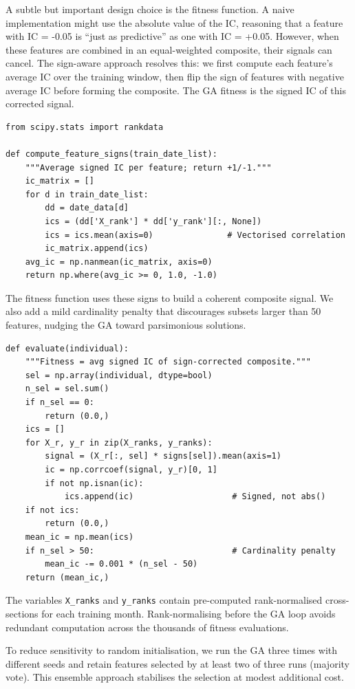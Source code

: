 A subtle but important design choice is the fitness function. A naive implementation might use the absolute value of the IC, reasoning that a feature with IC = -0.05 is ``just as predictive'' as one with IC = +0.05. However, when these features are combined in an equal-weighted composite, their signals can cancel. The sign-aware approach resolves this: we first compute each feature's average IC over the training window, then flip the sign of features with negative average IC before forming the composite. The GA fitness is the signed IC of this corrected signal.

\begin{verbatim}
from scipy.stats import rankdata

def compute_feature_signs(train_date_list):
    """Average signed IC per feature; return +1/-1."""
    ic_matrix = []
    for d in train_date_list:
        dd = date_data[d]
        ics = (dd['X_rank'] * dd['y_rank'][:, None])
        ics = ics.mean(axis=0)               # Vectorised correlation
        ic_matrix.append(ics)
    avg_ic = np.nanmean(ic_matrix, axis=0)
    return np.where(avg_ic >= 0, 1.0, -1.0)
\end{verbatim}

The fitness function uses these signs to build a coherent composite signal. We also add a mild cardinality penalty that discourages subsets larger than 50 features, nudging the GA toward parsimonious solutions.

\begin{verbatim}
def evaluate(individual):
    """Fitness = avg signed IC of sign-corrected composite."""
    sel = np.array(individual, dtype=bool)
    n_sel = sel.sum()
    if n_sel == 0:
        return (0.0,)
    ics = []
    for X_r, y_r in zip(X_ranks, y_ranks):
        signal = (X_r[:, sel] * signs[sel]).mean(axis=1)
        ic = np.corrcoef(signal, y_r)[0, 1]
        if not np.isnan(ic):
            ics.append(ic)                    # Signed, not abs()
    if not ics:
        return (0.0,)
    mean_ic = np.mean(ics)
    if n_sel > 50:                            # Cardinality penalty
        mean_ic -= 0.001 * (n_sel - 50)
    return (mean_ic,)
\end{verbatim}

The variables \texttt{X\_ranks} and \texttt{y\_ranks} contain pre-computed rank-normalised cross-sections for each training month. Rank-normalising before the GA loop avoids redundant computation across the thousands of fitness evaluations.

To reduce sensitivity to random initialisation, we run the GA three times with different seeds and retain features selected by at least two of three runs (majority vote). This ensemble approach stabilises the selection at modest additional cost.

